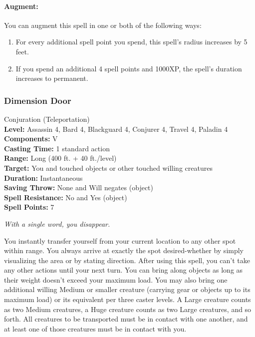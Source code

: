\paragraph{Augment:} You can augment this spell in one or both of the following ways:
\begin{enumerate}
 \item For every additional spell point you spend, this spell's radius increases by 5 feet.
 \item If you spend an additional 4 spell points and 1000XP, the spell's duration increases to permanent.
\end{enumerate}
\subsubsection{Dimension Door}
\label{Spell:DimensionDoor}
Conjuration (Teleportation)
\\ \textbf{Level:} Assassin 4, Bard 4, Blackguard 4, Conjurer 4, Travel 4, Paladin 4
\\ \textbf{Components:} V
\\ \textbf{Casting Time:} 1 standard action
\\ \textbf{Range:} Long (400 ft. + 40 ft./level)
\\ \textbf{Target:} You and touched objects or other touched willing creatures
\\ \textbf{Duration:} Instantaneous
\\ \textbf{Saving Throw:} None and Will negates (object)
\\ \textbf{Spell Resistance:} No and Yes (object)
\\ \textbf{Spell Points:} 7

\emph{With a single word, you disappear.}

You instantly transfer yourself from your current location to any other spot within range.
You always arrive at exactly the spot desired-whether by simply visualizing the area or by stating direction. 
After using this spell, you can't take any other actions until your next turn. 
You can bring along objects as long as their weight doesn't exceed your maximum load. 
You may also bring one additional willing Medium or smaller creature (carrying gear or objects up to its maximum load) 
or its equivalent per three caster levels. 
A Large creature counts as two Medium creatures, a Huge creature counts as two Large creatures, and so forth. 
All creatures to be transported must be in contact with one another, 
and at least one of those creatures must be in contact with you.

